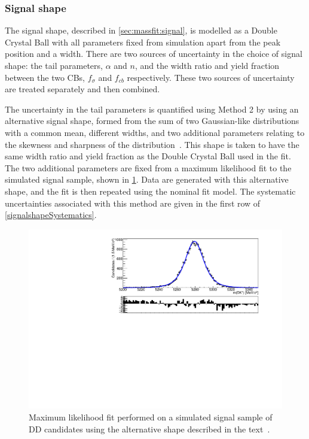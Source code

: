 \subsubsection{Signal shape}
\label{sec:systematics:signal}

The signal shape, described in \sect\ref{sec:massfit:signal}, is modelled as a Double Crystal Ball with all parameters fixed from simulation apart from the peak position and a width. There are two sources of uncertainty in the choice of signal shape: the tail parameters, $\alpha$ and $n$, and the width ratio and yield fraction between the two CBs, $f_{\sigma}$ and $f_{cb}$ respectively. These two sources of uncertainty are treated separately and then combined. 

The uncertainty in the tail parameters is quantified using Method 2 by using an alternative signal shape, formed from the sum of two Gaussian-like distributions with a common mean, different widths, and two additional parameters relating to the skewness and sharpness of the distribution~\cite{doublejohnson}. This shape is taken to have the same width ratio and yield fraction as the Double Crystal Ball used in the \CP fit. The two additional parameters are fixed from a maximum likelihood fit to the simulated signal sample, shown in \fig\ref{signalshapesys}. Data are generated with this alternative shape, and the \CP fit is then repeated using the nominal fit model. The systematic uncertainties associated with this method are given in the first row of \tab\ref{signalshapeSystematics}.

\begin{figure}[h]
\centering
\includegraphics[width=0.7\linewidth]{figures/fitComponents/signalShape_DD_KPi_Johnson.pdf}
\caption{Maximum likelihood fit performed on a simulated signal sample of DD candidates using the alternative shape described in the text~\cite{doublejohnson}.}
\label{signalshapesys}
\end{figure}

